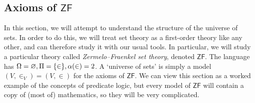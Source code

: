 \subsection{Axioms of \texorpdfstring{\(\mathsf{ZF}\)}{ZF}}
In this section, we will attempt to understand the structure of the universe of sets.
In order to do this, we will treat set theory as a first-order theory like any other, and can therefore study it with our usual tools.
In particular, we will study a particular theory called \emph{Zermelo--Fraenkel set theory}, denoted \( \mathsf{ZF} \).
The language has \( \Omega = \varnothing, \Pi = \qty{\in}, \alpha(\in) = 2 \).
A `universe of sets' is simply a model \( (V, \in_V) = (V, \in) \) for the axioms of \( \mathsf{ZF} \).
We can view this section as a worked example of the concepts of predicate logic, but every model of \( \mathsf{ZF} \) will contain a copy of (most of) mathematics, so they will be very complicated.

